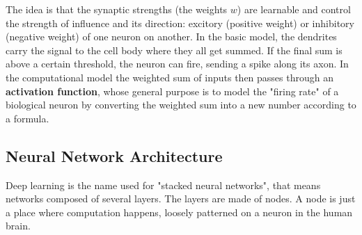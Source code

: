 The idea is that the synaptic strengths (the weights $w$) are learnable and control the strength of influence and its direction: excitory (positive weight) or inhibitory (negative weight) of one neuron on another. In the basic model, the dendrites carry the signal to the cell body where they all get summed. If the final sum is above a certain threshold, the neuron can fire, sending a spike along its axon. In the computational model the weighted sum of inputs then passes through an \textbf{activation function}, whose general purpose is to model the "firing rate" of a biological neuron by converting the weighted sum into a new number according to a formula.
\subsection{Neural Network Architecture}
Deep learning is the name used for "stacked neural networks", that means networks composed of several layers. The layers are made of nodes. A node is just a place where computation happens, loosely patterned on a neuron in the human brain. 


